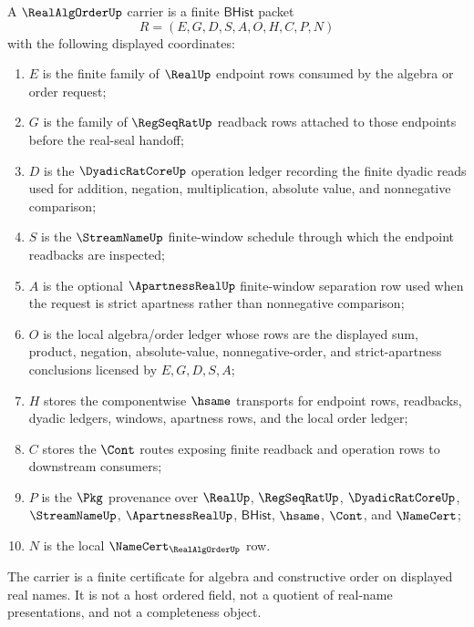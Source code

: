\begin{definition}
\label{def:real-alg-order-carrier}
A $\RealAlgOrderUp$ carrier is a finite $\mathsf{BHist}$ packet
$$
R=(E,G,D,S,A,O,H,C,P,N)
$$
with the following displayed coordinates:
\begin{enumerate}
\item $E$ is the finite family of $\RealUp$ endpoint rows consumed by the algebra or order request;
\item $G$ is the family of $\RegSeqRatUp$ readback rows attached to those endpoints before the real-seal handoff;
\item $D$ is the $\DyadicRatCoreUp$ operation ledger recording the finite dyadic reads used for addition, negation, multiplication, absolute value, and nonnegative comparison;
\item $S$ is the $\StreamNameUp$ finite-window schedule through which the endpoint readbacks are inspected;
\item $A$ is the optional $\ApartnessRealUp$ finite-window separation row used when the request is strict apartness rather than nonnegative comparison;
\item $O$ is the local algebra/order ledger whose rows are the displayed sum, product, negation, absolute-value, nonnegative-order, and strict-apartness conclusions licensed by $E,G,D,S,A$;
\item $H$ stores the componentwise $\hsame$ transports for endpoint rows, readbacks, dyadic ledgers, windows, apartness rows, and the local order ledger;
\item $C$ stores the $\Cont$ routes exposing finite readback and operation rows to downstream consumers;
\item $P$ is the $\Pkg$ provenance over $\RealUp$, $\RegSeqRatUp$, $\DyadicRatCoreUp$, $\StreamNameUp$, $\ApartnessRealUp$, $\mathsf{BHist}$, $\hsame$, $\Cont$, and $\NameCert$;
\item $N$ is the local $\NameCert_{\RealAlgOrderUp}$ row.
\end{enumerate}
The carrier is a finite certificate for algebra and constructive order on displayed real names. It is not a host ordered field, not a quotient of real-name presentations, and not a completeness object.
\end{definition}

